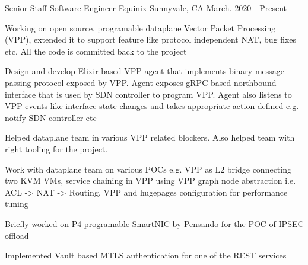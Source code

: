 

\begin{cventries}

  \cventry
    {Senior Staff Software Engineer} %
    {Equinix} %
    {Sunnyvale, CA} %
    {March. 2020 - Present} %
    {
      \begin{cvitems} %
        \item {Working on open source, programable dataplane Vector Packet Processing (VPP), extended it to support feature like protocol independent NAT, bug fixes etc.
               All the code is committed back to the project}
        \item {Design and develop Elixir based VPP agent that implements binary message passing protocol exposed by VPP.
               Agent exposes gRPC based northbound interface that is used by SDN controller to program VPP. Agent also listens to VPP events like interface state changes and
               takes appropriate action defined e.g. notify SDN controller etc}
        \item {Helped dataplane team in various VPP related blockers. Also helped team with right tooling for the project.}
        \item {Work with dataplane team on various POCs e.g. VPP as L2 bridge connecting two KVM VMs, service chaining in VPP using VPP graph node abstraction i.e. ACL -> NAT -> Routing,
               VPP and hugepages configuration for performance tuning}
        \item {Briefly worked on P4 programable SmartNIC by Pensando for the POC of IPSEC offload}
        \item {Implemented Vault based MTLS authentication for one of the REST services}
      \end{cvitems}
    }


\end{cventries}
